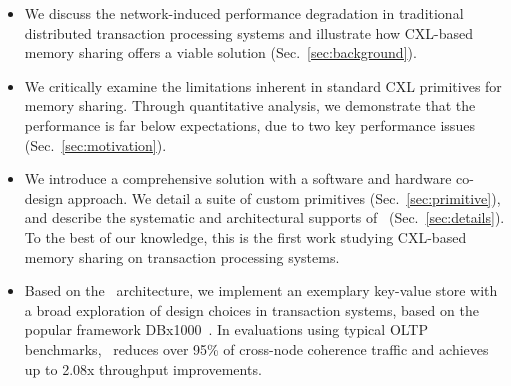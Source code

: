 \begin{itemize}


    
    
    
    
    \item We discuss the network-induced performance degradation in traditional distributed transaction processing systems and illustrate how CXL-based memory sharing offers a viable solution (Sec.~\ref{sec:background}).

    \item We critically examine the limitations inherent in standard CXL primitives for memory sharing. Through quantitative analysis, we demonstrate that the performance is far below expectations, due to two key performance issues (Sec.~\ref{sec:motivation}).

    \item We introduce a comprehensive solution with a software and hardware co-design approach. We detail a suite of custom primitives (Sec.~\ref{sec:primitive}), and describe the systematic and architectural supports of \name~(Sec.~\ref{sec:details}). To the best of our knowledge, this is the first work studying CXL-based memory sharing on transaction processing systems.

    \item Based on the \name~architecture, we implement an exemplary key-value store with a broad exploration of design choices in transaction systems, based on the popular framework DBx1000~\cite{abyss_vldb14}. In evaluations using typical OLTP benchmarks, \name~reduces over 95\% of cross-node coherence traffic and achieves up to 2.08x throughput improvements.


\end{itemize}


